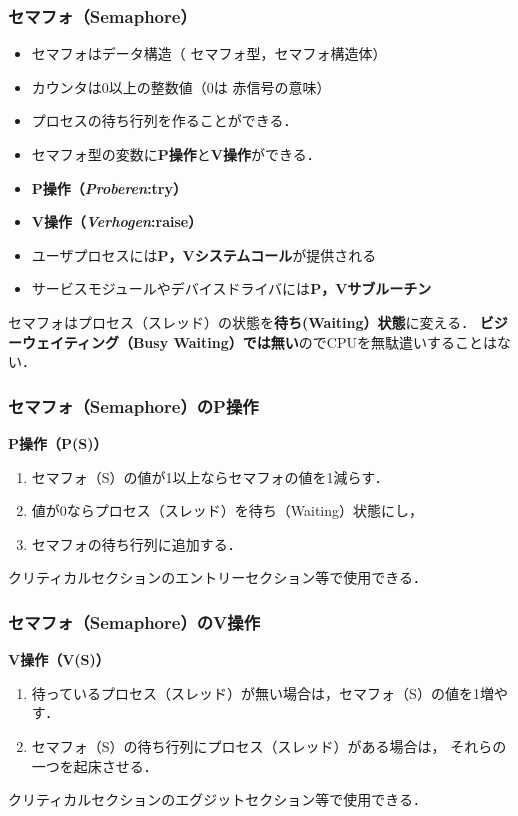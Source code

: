 \documentclass[dvipdfmx]{beamer}
\begin{document}
\begin{frame}
  \frametitle{セマフォ（Semaphore）}
  \begin{itemize}
  \item セマフォはデータ構造（{\color{red} セマフォ型}，セマフォ構造体）
  \item カウンタは0以上の整数値（0は{\color{red} 赤信号}の意味）
  \item プロセスの待ち行列を作ることができる．
  \item セマフォ型の変数に{\bf P操作}と{\bf V操作}ができる．
  \item {\bf P操作（{\it Proberen}:try）}
  \item {\bf V操作（{\it Verhogen}:raise）}
  \item ユーザプロセスには{\bf P，Vシステムコール}が提供される
  \item サービスモジュールやデバイスドライバには{\bf P，Vサブルーチン}
  \end{itemize}

セマフォはプロセス（スレッド）の状態を{\bf 待ち(Waiting）状態}に変える．
{\bf ビジーウェイティング（Busy Waiting）では無い}のでCPUを無駄遣いすることはない．
\end{frame}

\begin{frame}
  \frametitle{セマフォ（Semaphore）のP操作}
  {\bf P操作（P(S)）}
  \begin{enumerate}
  \item セマフォ（S）の値が1以上ならセマフォの値を1減らす．
  \item 値が0ならプロセス（スレッド）を待ち（Waiting）状態にし，
  \item セマフォの待ち行列に追加する．
  \end{enumerate}
  クリティカルセクションのエントリーセクション等で使用できる．

  \begin{center}
    \begin{minipage}{0.6\columnwidth}
      
    \end{minipage}
  \end{center}
\end{frame}

\begin{frame}
  \frametitle{セマフォ（Semaphore）のV操作}
  {\bf V操作（V(S)）}
  \begin{enumerate}
  \item 待っているプロセス（スレッド）が無い場合は，セマフォ（S）の値を1増やす．
  \item セマフォ（S）の待ち行列にプロセス（スレッド）がある場合は，
    それらの一つを起床させる．
  \end{enumerate}
  クリティカルセクションのエグジットセクション等で使用できる．

  \begin{center}
    \begin{minipage}{0.6\columnwidth}
      
    \end{minipage}
  \end{center}
\end{frame}
\end{document}
